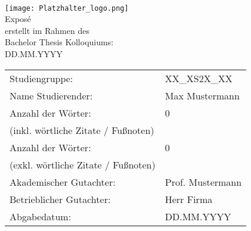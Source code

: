 \begin{center}
     \\ [3ex]
    \texttt{[image: Platzhalter\_logo.png]} \\ [3ex]
    \large{Exposé} \\ [-9pt]
    \large{erstellt im Rahmen des} \\ [-9pt]
    \large{Bachelor Thesis Kolloquiums:} \\ [-9pt]
    \large{DD.MM.YYYY}
\end{center}

\renewcommand{\arraystretch}{2.5}
\begin{table}[h]
    \setlength{\tabcolsep}{32pt}
    \begin{tabularx}{\textwidth}{l l}
        Studiengruppe:                      & XX\_XS2X\_XX     \\
        Name Studierender:                  & Max Mustermann   \\
        Anzahl der Wörter:                  & 0                \\ [-15pt]
        (inkl. wörtliche Zitate / Fußnoten) & ~                \\
        Anzahl der Wörter:                  & 0                \\ [-15pt]
        (exkl. wörtliche Zitate / Fußnoten) & ~                \\
        Akademischer Gutachter:             & Prof. Mustermann \\
        Betrieblicher Gutachter:            & Herr Firma       \\
        Abgabedatum:                        & DD.MM.YYYY       \\
    \end{tabularx}
\end{table}

\newpage